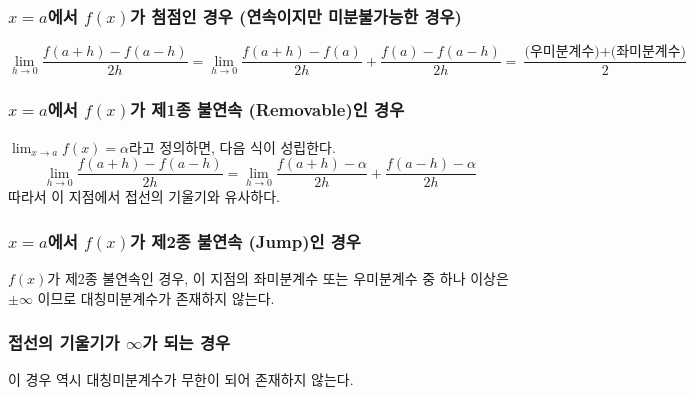 \documentclass{scrartcl}
\begin{document}
\subsubsection{\(x=a\)에서 \(f(x)\)가 첨점인 경우 (연속이지만 미분불가능한 경우)}
\[
\lim_{h\to0}\frac{f(a+h)-f(a-h)}{2h} = \lim_{h\to0}\frac{f(a+h)-f(a)}{2h}+\frac{f(a)-f(a-h)}{2h} =\frac{\text{(우미분계수)}+\text{(좌미분계수)}}{2}
\]

\subsubsection{\(x=a\)에서 \(f(x)\)가 제1종 불연속 (Removable)인 경우}
\(\lim_{x\to a}{f(x)}=\alpha\)라고 정의하면, 다음 식이 성립한다.
\[
\lim_{h\to0}\frac{f(a+h)-f(a-h)}{2h} = \lim_{h\to0}\frac{f(a+h)-\alpha}{2h}+\frac{f(a-h)-\alpha}{2h}
\]
따라서 이 지점에서 접선의 기울기와 유사하다.

\subsubsection{\(x=a\)에서 \(f(x)\)가 제2종 불연속 (Jump)인 경우}
\(f(x)\)가 제2종 불연속인 경우, 이 지점의 좌미분계수 또는 우미분계수 중 하나 이상은 \(\pm\infty\) 이므로 대칭미분계수가 존재하지 않는다.

\subsubsection{접선의 기울기가 \(\infty\)가 되는 경우}
이 경우 역시 대칭미분계수가 무한이 되어 존재하지 않는다.
\end{document}
